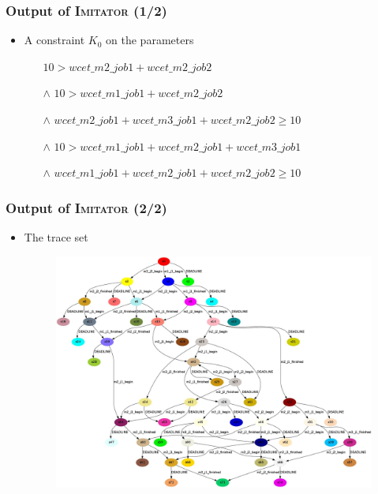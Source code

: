 \documentclass[professionalfont]{beamer}
\newcommand{\couleur}[1]{\textcolor{couleurimportante}{#1}}
\newcommand{\imitator}{\textsc{Imitator}}
\begin{document}
\begin{frame}
	\frametitle{Output of \imitator{} (1/2)}
	\begin{itemize}
		\item A \couleur{constraint} $K_0$ on the parameters 
		\medskip
		\begin{itemize}
			\item[]   $10 > wcet\_m2\_job1 + wcet\_m2\_job2$
			\item[$\wedge$] $10 > wcet\_m1\_job1 + wcet\_m2\_job2$
			\item[$\wedge$] $wcet\_m2\_job1 + wcet\_m3\_job1 + wcet\_m2\_job2 \geq 10$
			\item[$\wedge$] $10 > wcet\_m1\_job1 + wcet\_m2\_job1 + wcet\_m3\_job1$
			\item[$\wedge$] $wcet\_m1\_job1 + wcet\_m2\_job1 + wcet\_m2\_job2 \geq 10$
		\end{itemize}
	\end{itemize}
\end{frame}
\begin{frame}
	\frametitle{Output of \imitator{} (2/2)}
	\begin{itemize}
		\item The \couleur{trace set}
		\begin{figure}[!ht]
			\centering
			\includegraphics[scale = 0.12]{./figures/trace_set.jpg}
		\end{figure}
	\end{itemize}
\end{frame}
\end{document}
